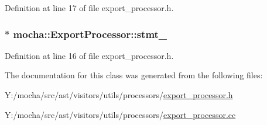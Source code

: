 Definition at line 17 of file export\_\-processor.h.

\hypertarget{classmocha_1_1_export_processor_af04fa3e3d50648d6a8149bb497e69546}{
\subsubsection[{stmt\_\-}]{$\ast$ {\bf mocha::ExportProcessor::stmt\_\-}}}
\label{classmocha_1_1_export_processor_af04fa3e3d50648d6a8149bb497e69546}


Definition at line 16 of file export\_\-processor.h.



The documentation for this class was generated from the following files:\begin{DoxyCompactItemize}
\item 
Y:/mocha/src/ast/visitors/utils/processors/\hyperlink{export__processor_8h}{export\_\-processor.h}\item 
Y:/mocha/src/ast/visitors/utils/processors/\hyperlink{export__processor_8cc}{export\_\-processor.cc}\end{DoxyCompactItemize}
